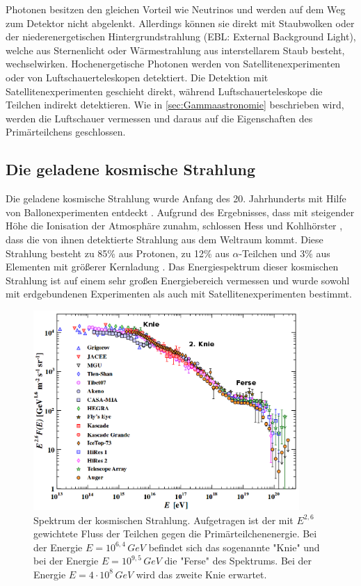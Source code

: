 Photonen besitzen den gleichen Vorteil wie Neutrinos und werden auf dem Weg zum Detektor nicht abgelenkt.
Allerdings können sie direkt mit Staubwolken oder der niederenergetischen Hintergrundstrahlung (EBL: External Background Light), welche aus Sternenlicht oder Wärmestrahlung aus interstellarem Staub besteht, wechselwirken.
Hochenergetische Photonen werden von Satellitenexperimenten oder von Luftschauerteleskopen detektiert.
Die Detektion mit Satellitenexperimenten geschieht direkt, während Luftschauerteleskope die Teilchen indirekt detektieren.
Wie in \autoref{sec:Gammaastronomie} beschrieben wird, werden die Luftschauer vermessen und daraus auf die Eigenschaften des Primärteilchens geschlossen.


\subsection{Die geladene kosmische Strahlung}
Die geladene kosmische Strahlung wurde Anfang des 20. Jahrhunderts mit Hilfe von Ballonexperimenten entdeckt \cite{Hess}.
Aufgrund des Ergebnisses, dass mit steigender Höhe die Ionisation der Atmosphäre zunahm, schlossen Hess und Kohlhörster \cite{Kohlhoerster}, dass die von ihnen detektierte Strahlung aus dem Weltraum kommt.
Diese Strahlung besteht zu 85\% aus Protonen, zu 12\% aus $\alpha$-Teilchen und 3\% aus Elementen mit größerer Kernladung \cite{Grupen}.
Das Energiespektrum dieser kosmischen Strahlung ist auf einem sehr großen Energiebereich vermessen und wurde sowohl mit erdgebundenen Experimenten als auch mit Satellitenexperimenten bestimmt.


\begin{figure}
    \centering
    \includegraphics[width=0.9\textwidth]{./Plots/02_Astroteilchenphysik/CosmicRaySpectrum2.png}
    \caption{Spektrum der kosmischen Strahlung. 
      Aufgetragen ist der mit $E^{2,6}$ gewichtete Fluss der Teilchen gegen die Primärteilchenenergie. 
      Bei der Energie $E=10^{6,4}\,\si{GeV}$ befindet sich das sogenannte "Knie" und bei der Energie $E=10^{9,5}\,\si{GeV}$ die "Ferse" des Spektrums. 
      Bei der Energie $E=4\cdot 10^8\,\si{GeV}$ \cite{Knie} wird das zweite Knie erwartet.\cite{PDG}}
    \label{CR-Spektrum}
\end{figure}



